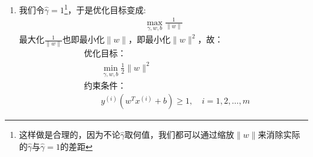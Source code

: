 \begin{enumerate}
	\item 我们令$\hat{\gamma}=1$\footnote{这样做是合理的，因为不论$\hat{\gamma}$取何值，我们都可以通过缩放$\|w\|$来消除实际的$\hat{\gamma}$与$\hat{\gamma}=1$的差距}，于是优化目标变成:
	\begin{align}
		\max_{\gamma, w, b} \frac{1}{\|w\|}
	\end{align}
	最大化$\frac{1}{\|w\|}$也即最小化$\|w\|$，即最小化$\|w\|^2$，故：
	\begin{align}
		&\text{优化目标：} \\
		& \qquad \min_{\gamma, w, b} \frac{1}{2}\|w\|^2 \\
		&\text{约束条件：} \\
		& \qquad y^{(i)}(w^Tx^{(i)}+b) \geq 1, \quad i=1, 2, \dots, m
	\end{align}
\end{enumerate}



































